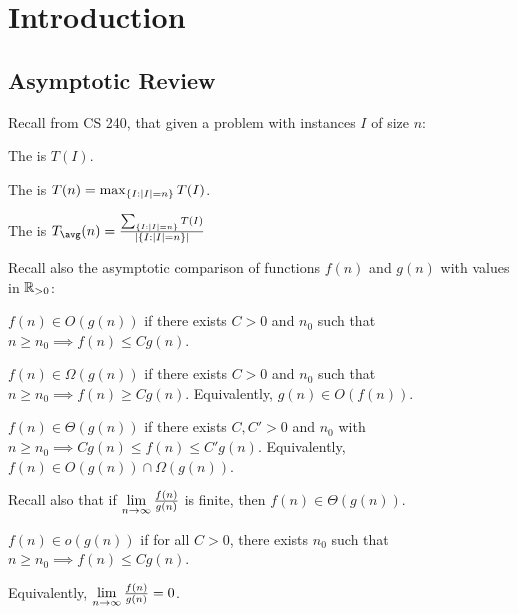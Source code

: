 \chapter{Introduction}
\section{Asymptotic Review}

Recall from CS 240, that given a problem with instances $I$ of size $n$:

\begin{defn*}[runtime]
  The  is $T(I)$.

  The  is $T(n) = \max_{\{I : \abs{I} = n\}} T(I)$.

  The  is $T_{\avg}(n) = \frac{\sum_{\{I : \abs{I} = n\}} T(I)}{\abs{\{I : \abs{I} = n\}}}$
\end{defn*}

Recall also the asymptotic comparison of functions $f(n)$ and $g(n)$
with values in $\mathbb{R}_{>0}$:

\begin{defn}[big-$O$]
  $f(n) \in O(g(n))$ if there exists $C > 0$ and $n_0$
  such that $n \geq n_0 \implies f(n) \leq Cg(n)$.
\end{defn}

\begin{defn}
  $f(n) \in \Omega(g(n))$ if there exists $C > 0$ and $n_0$
  such that $n \geq n_0 \implies f(n) \geq Cg(n)$.
  Equivalently, $g(n) \in O(f(n))$.
\end{defn}

\begin{defn}
  $f(n) \in \Theta(g(n))$ if there exists $C, C' > 0$ and $n_0$
  with $n \geq n_0 \implies Cg(n) \leq f(n) \leq C'g(n)$.
  Equivalently, $f(n) \in O(g(n)) \cap \Omega(g(n))$.

  Recall also that if $\lim\limits_{n\to\infty}\frac{f(n)}{g(n)}$ is finite,
  then $f(n) \in \Theta(g(n))$.
\end{defn}

\begin{defn}[little-$o$]
  $f(n) \in o(g(n))$ if for all $C > 0$, there exists $n_0$
  such that $n \geq n_0 \implies f(n) \leq Cg(n)$.

  Equivalently, $\lim\limits_{n\to\infty}\frac{f(n)}{g(n)} = 0$.
\end{defn}

